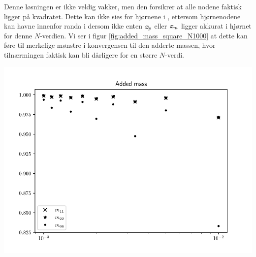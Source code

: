 \noindent Denne løsningen er ikke veldig vakker, men den forsikrer at alle nodene faktisk ligger på kvadratet.
Dette kan ikke sies for hjørnene i \zhett, ettersom hjørnenodene kan havne innenfor randa i dersom ikke enten ${\textit{\texttt{x}}}_p$ eller ${\textit{\texttt{x}}}_m$ ligger akkurat i hjørnet for denne $N$-verdien.
Vi ser i figur \ref{fig:added_mass_square_N1000} at dette kan føre til merkelige mønstre i konvergensen til den adderte massen, hvor tilnærmingen faktisk kan bli dårligere for en større $N$-verdi.
\begin{Figure}
    \centering
    \captionsetup{type = figure}
    \includegraphics[width = \linewidth]{addedmass_square_N1000.pdf}
    \label{fig:added_mass_square_N1000}
\end{Figure}

